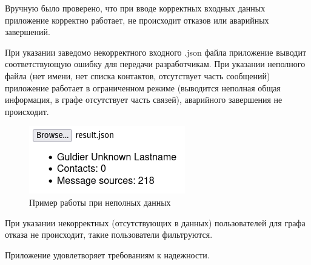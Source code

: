 Вручную было проверено, что при вводе корректных входных данных приложение корректно работает, не происходит отказов или аварийных завершений.

При указании заведомо некорректного входного .json файла приложение выводит соответствующую ошибку для передачи разработчикам.
При указании неполного файла (нет имени, нет списка контактов, отсутствует часть сообщений) приложение работает в ограниченном режиме (выводится неполная общая информация, в графе отсутствует часть связей), аварийного завершения не происходит.


\begin{figure}[h!]
    \includegraphics{pmi/img/partialtotal.png}
    \caption{Пример работы при неполных данных}
    \label{fig:dataex}
\end{figure}


При указании некорректных (отсутствующих в данных) пользователей для графа отказа не происходит, такие пользователи фильтруются.

Приложение удовлетворяет требованиям к надежности.